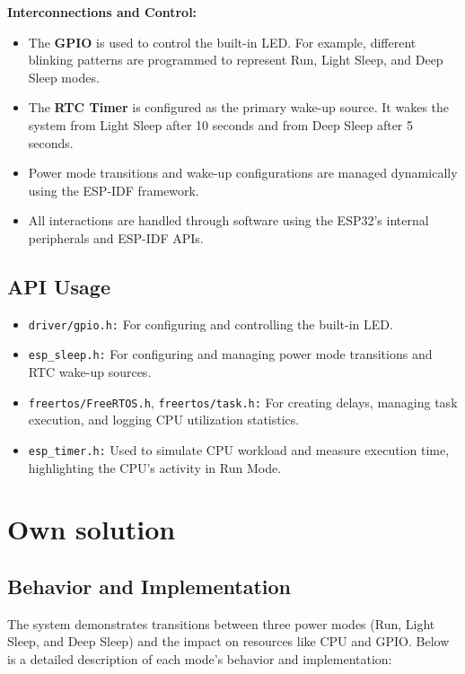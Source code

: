 \documentclass[a4paper, 11pt]{article}
\begin{document}
    \textbf{Interconnections and Control:}
    \begin{itemize}
        \item The \textbf{GPIO} is used to control the built-in LED. For example, different blinking patterns are programmed to represent Run, Light Sleep, and Deep Sleep modes.
        \item The \textbf{RTC Timer} is configured as the primary wake-up source. It wakes the system from Light Sleep after 10 seconds and from Deep Sleep after 5 seconds. 
        \item Power mode transitions and wake-up configurations are managed dynamically using the ESP-IDF framework. 
        \item All interactions are handled through software using the ESP32’s internal peripherals and ESP-IDF APIs. 
    \end{itemize}

    \subsection{API Usage}
    \begin{itemize}
        \item \texttt{driver/gpio.h:} For configuring and controlling the built-in LED.
        \item \texttt{esp\_sleep.h:} For configuring and managing power mode transitions and RTC wake-up sources.
        \item \texttt{freertos/FreeRTOS.h}, \texttt{freertos/task.h:} For creating delays, managing task execution, and logging CPU utilization statistics.
        \item \texttt{esp\_timer.h:} Used to simulate CPU workload and measure execution time, highlighting the CPU's activity in Run Mode.
    \end{itemize}

    \section{Own solution}
    \subsection{Behavior and Implementation}
    
    The system demonstrates transitions between three power modes (Run, Light Sleep, and Deep Sleep) and the impact on resources like CPU and GPIO. Below is a detailed description of each mode's behavior and implementation:
    
\end{document}

